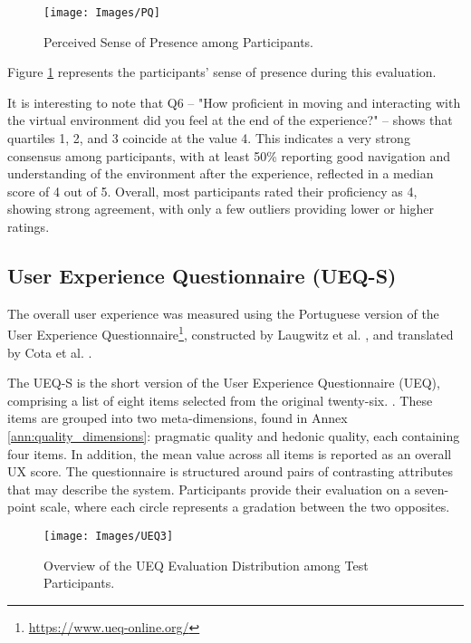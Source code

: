 \begin{figure}[h!]
    \centering
    \texttt{[image: Images/PQ]}
    \caption{Perceived Sense of Presence among Participants.} 
    \label{fig:PQ}
\end{figure}

Figure \ref{fig:PQ} represents the participants’ sense of presence during this evaluation.

It is interesting to note that Q6 – "How proficient in moving and interacting with the virtual environment did you feel at the end of the experience?" – shows that quartiles 1, 2, and 3 coincide at the value 4. 
This indicates a very strong consensus among participants, with at least 50\% reporting good navigation and understanding of the environment after the experience, reflected in a median score of 4 out of 5. 
Overall, most participants rated their proficiency as 4, showing strong agreement, with only a few outliers providing lower or higher ratings.
\subsection{User Experience Questionnaire (UEQ-S)}

The overall user experience was measured using the Portuguese version of the User Experience Questionnaire\footnote{\url{https://www.ueq-online.org/}}, constructed by Laugwitz et al. \cite{inproceedings}, and translated by Cota et al. \cite{article_t}.

The UEQ-S is the short version of the User Experience Questionnaire (UEQ), comprising a list of eight items selected from the original twenty-six. \cite{article_ueq}. These items are grouped into two meta-dimensions, found in Annex \ref{ann:quality_dimensions}: pragmatic quality and hedonic quality, each containing four items.
In addition, the mean value across all items is reported as an overall \gls{UX} score.
The questionnaire is structured around pairs of contrasting attributes that may describe the system. Participants provide their evaluation on a seven-point scale, where each circle represents a gradation between the two opposites.


\begin{figure}[h!]
    \centering
    \texttt{[image: Images/UEQ3]}
    \caption{Overview of the \gls{UEQ} Evaluation Distribution among Test Participants.} 
    \label{fig:UEQ2}
\end{figure}


